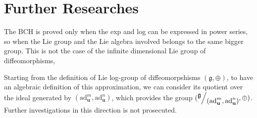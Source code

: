 \section{Further Researches}\label{se:further_research}




The BCH is proved only when the exp and log can be expressed in power series, so when the Lie group and the Lie algebra involved belongs to the same bigger group. This is not the case of the infinite dimensional Lie group of diffeomorphisms,




Starting from the definition of Lie log-group of diffeomorpshisms $(\mathfrak{g} , \oplus)$, to have an algebraic definition of this approximation, we can consider its quotient over the ideal generated by $(\text{ad}_{\mathbf{u}}^{m}, \text{ad}_{\mathbf{u}}^{n})$, which provides the group $(\quotient{\mathfrak{g}}{(\text{ad}_{\mathbf{u}}^{m}, \text{ad}_{\mathbf{u}}^{n})}, \oplus)$. Further investigations in this direction is not prosecuted.

